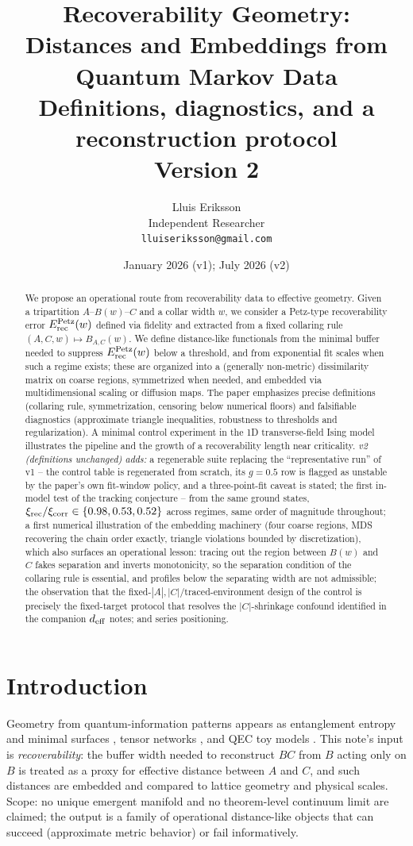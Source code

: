\documentclass[11pt]{article}
\title{Recoverability Geometry: Distances and Embeddings from Quantum
Markov Data\\
{\large Definitions, diagnostics, and a reconstruction protocol}\\
{\normalsize Version 2}}
\author{Lluis Eriksson\\ Independent Researcher\\ \texttt{lluiseriksson@gmail.com}}
\date{January 2026 (v1); July 2026 (v2)}
\theoremstyle{remark}
\newcommand{\Erec}{E^{\rm Petz}_{\rm rec}}
\begin{document}
\maketitle

\begin{abstract}
We propose an operational route from recoverability data to effective
geometry. Given a tripartition $A$--$B(w)$--$C$ and a collar width $w$, we
consider a Petz-type recoverability error $\Erec(w)$ defined via fidelity
and extracted from a fixed collaring rule $(A, C, w) \mapsto B_{A,C}(w)$.
We define distance-like functionals from the minimal buffer needed to
suppress $\Erec(w)$ below a threshold, and from exponential fit scales
when such a regime exists; these are organized into a (generally
non-metric) dissimilarity matrix on coarse regions, symmetrized when
needed, and embedded via multidimensional scaling or diffusion maps. The
paper emphasizes precise definitions (collaring rule, symmetrization,
censoring below numerical floors) and falsifiable diagnostics
(approximate triangle inequalities, robustness to thresholds and
regularization). A minimal control experiment in the 1D transverse-field
Ising model illustrates the pipeline and the growth of a recoverability
length near criticality. \emph{v2 (definitions unchanged) adds:} a
regenerable suite replacing the ``representative run'' of v1 -- the
control table is regenerated from scratch, its $g = 0.5$ row is flagged
as unstable by the paper's own fit-window policy, and a three-point-fit
caveat is stated; the first in-model test of the tracking conjecture --
from the same ground states, $\xi_{\rm rec}/\xi_{\rm corr} \in
\{0.98, 0.53, 0.52\}$ across regimes, same order of magnitude throughout;
a first numerical illustration of the embedding machinery (four coarse
regions, MDS recovering the chain order exactly, triangle violations
bounded by discretization), which also surfaces an operational lesson:
tracing out the region between $B(w)$ and $C$ fakes separation and
inverts monotonicity, so the separation condition of the collaring rule
is essential, and profiles below the separating width are not
admissible; the observation that the fixed-$|A|,|C|$/traced-environment
design of the control is precisely the fixed-target protocol that
resolves the $|C|$-shrinkage confound identified in the companion
$d_{\rm eff}$ notes; and series positioning.
\end{abstract}

\section{Introduction}
Geometry from quantum-information patterns appears as entanglement
entropy and minimal surfaces \cite{RT}, tensor networks \cite{Swingle},
and QEC toy models \cite{HaPPY}. This note's input is
\emph{recoverability}: the buffer width needed to reconstruct $BC$ from
$B$ acting only on $B$ is treated as a proxy for effective distance
between $A$ and $C$, and such distances are embedded and compared to
lattice geometry and physical scales. Scope: no unique emergent manifold
and no theorem-level continuum limit are claimed; the output is a family
of operational distance-like objects that can succeed (approximate metric
behavior) or fail informatively.
\end{document}
